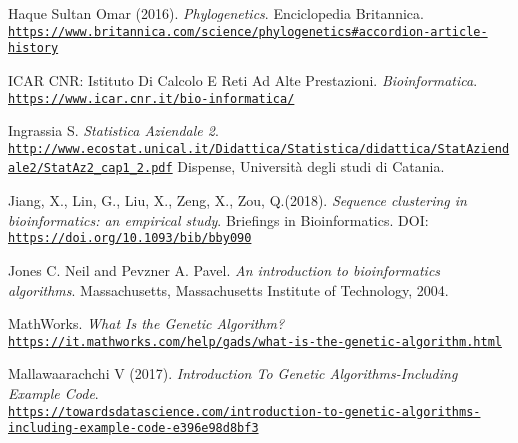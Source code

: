 \documentclass[twoside,openright,titlepage,fleqn,
,	headinclude,12pt,a4paper,BCOR5mm,footinclude,table]{scrbook}
\newcommand{\?}{'\-\nobreak\hspace{0pt}}
\begin{document}
\begin{thebibliography}{60}
Haque Sultan Omar (2016).\newline
\textit{Phylogenetics}.\newline
Enciclopedia Britannica.
\\\texttt{\url{https://www.britannica.com/science/phylogenetics\#accordion-article-history}}

ICAR CNR: Istituto Di Calcolo E Reti Ad Alte Prestazioni.\newline
\textit{Bioinformatica}.
\\\texttt{\url{https://www.icar.cnr.it/bio-informatica/}}

Ingrassia S. \newline
\textit{Statistica Aziendale 2}.
\\\texttt{\url{http://www.ecostat.unical.it/Didattica/Statistica/didattica/StatAziendale2/StatAz2_cap1_2.pdf}}\newline
Dispense, Università degli studi di Catania.


Jiang, X., Lin, G., Liu, X., Zeng, X., Zou, Q.(2018).\newline
\textit{Sequence clustering in bioinformatics: an empirical study}.\newline
Briefings in Bioinformatics.\newline
DOI: \\\texttt{\url{https://doi.org/10.1093/bib/bby090}}

Jones C. Neil and Pevzner A. Pavel.\newline
\textit{An introduction to bioinformatics algorithms}.\newline
Massachusetts, Massachusetts Institute of Technology, 2004.

MathWorks.\newline
\textit{What Is the Genetic Algorithm?}
\\\texttt{\url{https://it.mathworks.com/help/gads/what-is-the-genetic-algorithm.html}}

Mallawaarachchi V (2017).\newline
\textit{Introduction To Genetic Algorithms-Including Example Code}.
\\\texttt{\url{https://towardsdatascience.com/introduction-to-genetic-algorithms-including-example-code-e396e98d8bf3}}


\end{thebibliography}
\end{document}
